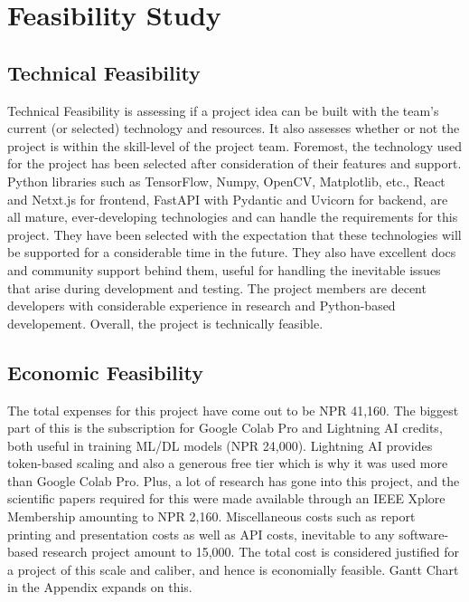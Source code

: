 \section{Feasibility Study}

\subsection{Technical Feasibility}

Technical Feasibility is assessing if a project idea can be built with the team's current (or selected) technology and resources. It also assesses whether or not the project is within the skill-level of the project team. Foremost, the technology used for the project has been selected after consideration of their features and support. Python libraries such as TensorFlow, Numpy, OpenCV, Matplotlib, etc., React and Netxt.js for frontend, FastAPI with Pydantic and Uvicorn for backend, are all mature, ever-developing technologies and can handle the requirements for this project. They have been selected with the expectation that these technologies will be supported for a considerable time in the future. They also have excellent docs and community support behind them, useful for handling the inevitable issues that arise during development and testing. The project members are decent developers with considerable experience in research and Python-based developement. Overall, the project is technically feasible.

\subsection{Economic Feasibility}

The total expenses for this project have come out to be NPR 41,160. The biggest part of this is the subscription for Google Colab Pro and Lightning AI credits, both useful in training ML/DL models (NPR 24,000). Lightning AI provides token-based scaling and also a generous free tier which is why it was used more than Google Colab Pro. Plus, a lot of research has gone into this project, and the scientific papers required for this were made available through an IEEE Xplore Membership amounting to NPR 2,160. Miscellaneous costs such as report printing and presentation costs as well as API costs, inevitable to any software-based research project amount to 15,000. The total cost is considered justified for a project of this scale and caliber, and hence is economially feasible. Gantt Chart in the Appendix expands on this.

